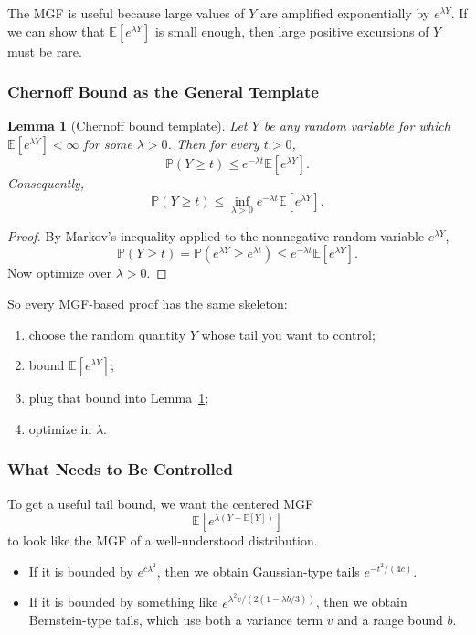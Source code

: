 \documentclass{article}
\newtheorem{lemma}[theorem]{Lemma}
\theoremstyle{definition}
\theoremstyle{remark}
\newcommand{\EE}{\mathbb{E}}
\newcommand{\PP}{\mathbb{P}}
\begin{document}
The MGF is useful because large values of $Y$ are amplified exponentially by $e^{\lambda Y}$. If we can show that $\EE[e^{\lambda Y}]$ is small enough, then large positive excursions of $Y$ must be rare.

\subsubsection{Chernoff Bound as the General Template}

\begin{lemma}[Chernoff bound template]
\label{lem:chernoff-template}
Let $Y$ be any random variable for which $\EE[e^{\lambda Y}] < \infty$ for some $\lambda > 0$. Then for every $t>0$,
$$
\PP(Y \ge t) \le e^{-\lambda t}\EE[e^{\lambda Y}].
$$
Consequently,
$$
\PP(Y \ge t) \le \inf_{\lambda > 0} e^{-\lambda t}\EE[e^{\lambda Y}].
$$
\end{lemma}

\begin{proof}
By Markov's inequality applied to the nonnegative random variable $e^{\lambda Y}$,
$$
\PP(Y \ge t)
=
\PP(e^{\lambda Y} \ge e^{\lambda t})
\le
e^{-\lambda t}\EE[e^{\lambda Y}].
$$
Now optimize over $\lambda > 0$.
\end{proof}

So every MGF-based proof has the same skeleton:
\begin{enumerate}
\item choose the random quantity $Y$ whose tail you want to control;
\item bound $\EE[e^{\lambda Y}]$;
\item plug that bound into Lemma~\ref{lem:chernoff-template};
\item optimize in $\lambda$.
\end{enumerate}

\subsubsection{What Needs to Be Controlled}

To get a useful tail bound, we want the centered MGF
$$
\EE[e^{\lambda (Y-\EE[Y])}]
$$
to look like the MGF of a well-understood distribution.

\begin{itemize}
\item If it is bounded by $e^{c\lambda^2}$, then we obtain Gaussian-type tails $e^{-t^2/(4c)}$.
\item If it is bounded by something like $e^{\lambda^2 v /(2(1-\lambda b/3))}$, then we obtain Bernstein-type tails, which use both a variance term $v$ and a range bound $b$.
\end{itemize}
\end{document}

